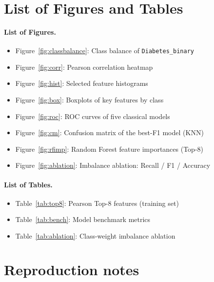 \documentclass[11pt,a4paper]{article}
\begin{document}
\begin{appendices}

\section{List of Figures and Tables}\label{sec:app-lists}

\paragraph{List of Figures.}
\begin{itemize}[leftmargin=*]
  \item Figure~\ref{fig:classbalance}: Class balance of \texttt{Diabetes\_binary}
  \item Figure~\ref{fig:corr}: Pearson correlation heatmap
  \item Figure~\ref{fig:hist}: Selected feature histograms
  \item Figure~\ref{fig:box}: Boxplots of key features by class
  \item Figure~\ref{fig:roc}: ROC curves of five classical models
  \item Figure~\ref{fig:cm}: Confusion matrix of the best-F1 model (KNN)
  \item Figure~\ref{fig:rfimp}: Random Forest feature importances (Top-8)
  \item Figure~\ref{fig:ablation}: Imbalance ablation: Recall / F1 / Accuracy
\end{itemize}

\paragraph{List of Tables.}
\begin{itemize}[leftmargin=*]
  \item Table~\ref{tab:top8}: Pearson Top-8 features (training set)
  \item Table~\ref{tab:bench}: Model benchmark metrics
  \item Table~\ref{tab:ablation}: Class-weight imbalance ablation
\end{itemize}

\section{Reproduction notes}\label{sec:app-repro}


\end{appendices}
\end{document}
